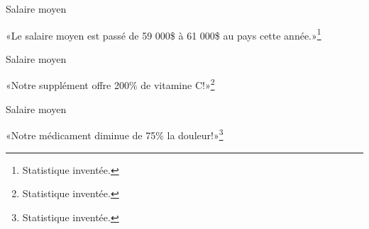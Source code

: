 \documentclass{BeamerTemplate}
\begin{document}
\begin{frame}{Salaire moyen}
\begin{center}
        \large «Le salaire moyen est passé de 59 000\$ à 61 000\$ au pays cette année.»\footnote{Statistique inventée.}
        
\end{center}

\end{frame}


\begin{frame}{Salaire moyen}
\begin{center}
        \large «Notre supplément offre 200\% de vitamine C!»\footnote{Statistique inventée.}
\end{center}



\end{frame}

\begin{frame}{Salaire moyen}
\begin{center}
        \large «Notre médicament diminue de 75\% la douleur!»\footnote{Statistique inventée.}
\end{center}



\end{frame}
\end{document}
